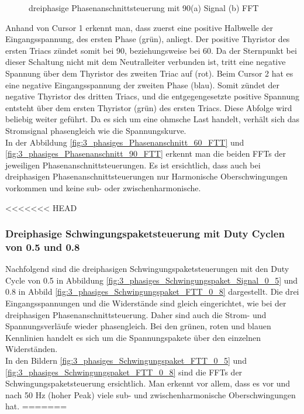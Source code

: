 \begin{figure}[ht!]
	\centering
	\qquad
	\caption{dreiphasige Phasenanschnittsteuerung mit 90\textdegree (a) Signal (b) FFT}
	\label{fig:dreiphasige_Phasenanschnittsteuerung_mit_90}
\end{figure}
Anhand von Cursor 1 erkennt man, dass zuerst eine positive Halbwelle der Eingangsspannung, des ersten Phase (grün), anliegt. Der positive Thyristor des ersten Triacs zündet somit bei 90\textdegree\hspace{0.02cm}, beziehungsweise bei 60\textdegree\hspace{0.02cm}. Da der Sternpunkt bei dieser Schaltung nicht mit dem Neutralleiter verbunden ist, tritt eine negative Spannung über dem Thyristor des zweiten Triac auf (rot). Beim Cursor 2 hat es eine negative Eingangsspannung der zweiten Phase (blau). Somit zündet der negative Thyristor des dritten Triacs, und die entgegengesetzte positive Spannung entsteht über dem ersten Thyristor (grün) des ersten Triacs. Diese Abfolge wird beliebig weiter geführt. Da es sich um eine ohmsche Last handelt, verhält sich das Stromsignal phasengleich wie die Spannungskurve.\\
In der Abbildung \ref{fig:3_phasiges_Phasenanschnitt_60_FTT} und \ref{fig:3_phasiges_Phasenanschnitt_90_FTT} erkennt man die beiden  FFTs der jeweiligen Phasenanschnittsteuerungen. Es ist ersichtlich, dass auch bei dreiphasigen Phasenanschnittsteuerungen nur Harmonische Oberschwingungen vorkommen und keine sub- oder zwischenharmonische. 

\newpage

<<<<<<< HEAD
\subsubsection{Dreiphasige Schwingungspaketsteuerung mit Duty Cyclen von 0.5 und 0.8}
Nachfolgend sind die dreiphasigen Schwingungspaketsteuerungen mit den Duty Cycle von 0.5 in Abbildung \ref{fig:3_phasiges_Schwingungspaket_Signal_0_5} und 0.8 in Abbild \ref{fig:3_phasiges_Schwingungspaket_FTT_0_8} dargestellt. Die drei Eingangsspannungen und die Widerstände sind gleich eingerichtet, wie bei der dreiphasigen Phasenanschnittsteuerung. Daher sind auch die Strom- und Spannungsverläufe wieder phasengleich. Bei den grünen, roten und blauen Kennlinien handelt es sich um die Spannungspakete über den einzelnen Widerständen.\\
In den Bildern \ref{fig:3_phasiges_Schwingungspaket_FTT_0_5} und \ref{fig:3_phasiges_Schwingungspaket_FTT_0_8} sind die FFTs der Schwingungspaketsteuerung ersichtlich. Man erkennt vor allem, dass es vor und nach 50 Hz (hoher Peak) viele sub- und zwischenharmonische Oberschwingungen hat.
=======

